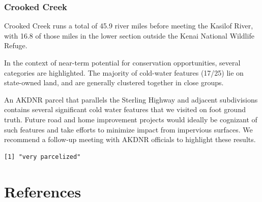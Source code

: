 \documentclass[
  letterpaper,
  DIV=11,
  numbers=noendperiod]{scrreprt}
\begin{document}
\hypertarget{crooked-creek}{%
\subsection{Crooked Creek}\label{crooked-creek}}

Crooked Creek runs a total of 45.9 river miles before meeting the
Kasilof River, with 16.8 of those miles in the lower section outside the
Kenai National Wildlife Refuge.

In the context of near-term potential for conservation opportunities,
several categories are highlighted. The majority of cold-water features
(17/25) lie on state-owned land, and are generally clustered together in
close groups.

An AKDNR parcel that parallels the Sterling Highway and adjacent
subdivisions contains several significant cold water features that we
visited on foot ground truth. Future road and home improvement projects
would ideally be cognizant of such features and take efforts to minimize
impact from impervious surfaces. We recommend a follow-up meeting with
AKDNR officials to highlight these results.

\begin{verbatim}
[1] "very parcelized"
\end{verbatim}


\hypertarget{references}{%
\chapter*{References}\label{references}}

\end{document}
